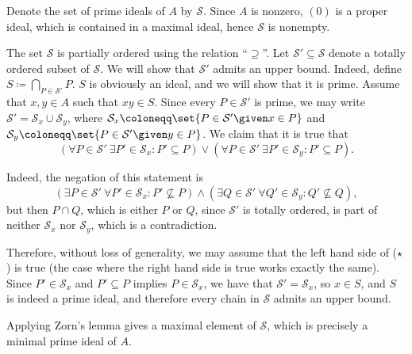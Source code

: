 Denote the set of prime ideals of $A$ by $\mathcal{S}$. Since $A$ is nonzero,
$(0)$ is a proper ideal, which is contained in a maximal ideal, hence $\mathcal{S}$ is
nonempty.

The set $\mathcal{S}$ is partially ordered using the relation \enquote{$\supseteq$}.
Let  $\mathcal{S}' \subseteq \mathcal{S}$ denote a totally ordered subset of $\mathcal{S}$.
We will show that $\mathcal{S}'$ admits an upper bound. Indeed,
define $S\coloneqq \bigcap_{P \in \mathcal{S}'} P$. $S$ is obviously an ideal, and
we will show that it is prime. Assume that $x, y \in A$ such that $xy \in S$. Since
every $P \in \mathcal{S}'$ is prime, we may write $\mathcal{S}' = \mathcal{S}_x \cup \mathcal{S}_y$,
where $\mathcal{S}_x \coloneqq \set{P \in \mathcal{S}' \given x \in P}$ and
$\mathcal{S}_y\coloneqq\set{P \in \mathcal{S}'\given y \in P}$. We claim that it is true that
\begin{equation}\tag{$\star$}
	(\forall P \in \mathcal{S}'~\exists P' \in \mathcal{S}_x\colon P' \subseteq P) \vee
	(\forall P \in \mathcal{S}'~\exists P' \in \mathcal{S}_y\colon P' \subseteq P).
\end{equation}

Indeed, the negation of this statement is
\[
	(\exists P \in \mathcal{S}'~\forall P' \in \mathcal{S}_x\colon P' \nsubseteq P) \wedge
	(\exists Q \in \mathcal{S}'~\forall Q' \in \mathcal{S}_y\colon Q' \nsubseteq Q),
\]
but then $P\cap Q$, which is either $P$ or $Q$, since $\mathcal{S}'$ is totally
ordered, is part of neither $\mathcal{S}_x$ nor $\mathcal{S}_y$, which is a
contradiction.

Therefore, without loss of generality, we may assume that the left hand side
of ($\star$) is true (the case where the right hand side is true works exactly
the same). Since $P' \in \mathcal{S}_x$ and $P' \subseteq P$ implies
$P \in \mathcal{S}_x$, we have that $\mathcal{S}' = \mathcal{S}_x$, so $x \in S$, and
$S$ is indeed a prime ideal, and therefore every chain in $\mathcal{S}$ admits
an upper bound.

Applying Zorn's lemma gives a maximal element of $\mathcal{S}$, which is precisely
a minimal prime ideal of $A$.
